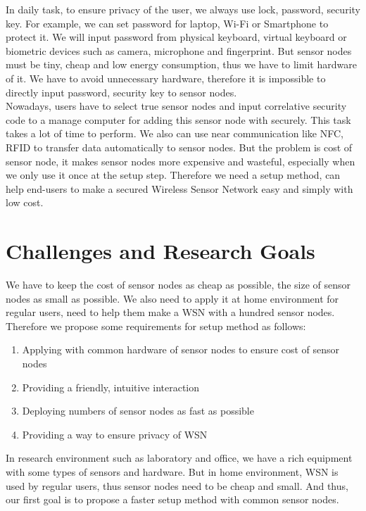 In daily task, to ensure privacy of the user, we always use lock, password, security key. For example, we can set password for laptop, Wi-Fi or Smartphone to protect it. We will input password from physical keyboard, virtual keyboard or biometric devices such as camera, microphone and fingerprint. But sensor nodes must be tiny, cheap and low energy consumption, thus we have to limit hardware of it. We have to avoid unnecessary hardware, therefore it is impossible to directly input password, security key to sensor nodes. \\
Nowadays, users have to select true sensor nodes and input correlative security code to a manage computer for adding this sensor node with securely. This task takes a lot of time to perform. We also can use near communication like NFC, RFID to transfer data automatically to sensor nodes. But the problem is cost of sensor node, it makes sensor nodes more expensive and wasteful, especially when we only use it once at the setup step. Therefore we need a setup method, can help end-users to make a secured Wireless Sensor Network easy and simply with low cost.
\section{Challenges and Research Goals}\label{sec:challenge}
We have to keep the cost of sensor nodes as cheap as possible, the size of sensor nodes as small as possible. We also need to apply it at home environment for regular users, need to help them make a WSN with a hundred sensor nodes. Therefore we propose some requirements for setup method as follows: 
\begin{enumerate}
\item Applying with common hardware of sensor nodes to ensure cost of sensor nodes
\item Providing a friendly, intuitive interaction
\item Deploying numbers of sensor nodes as fast as possible
\item Providing a way to ensure privacy of WSN
\end{enumerate}

In research environment such as laboratory and office, we have a rich equipment with some types of sensors and hardware. But in home environment, WSN is used by regular users, thus sensor nodes need to be cheap and small. And thus, our first goal is to propose a faster setup method with common sensor nodes.

